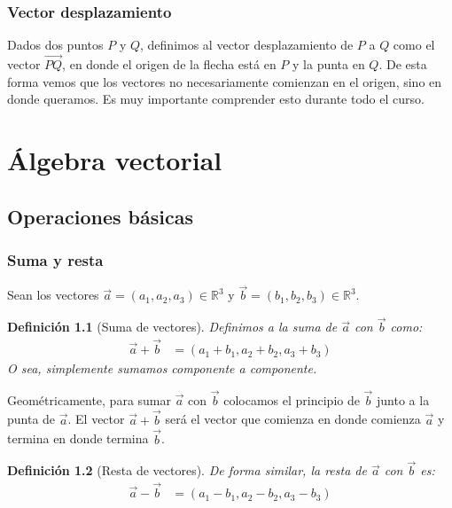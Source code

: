 \documentclass[12pt, fleqn]{report}                             %
\newtheorem{Definition}{Definición}[section]                    %
\newcommand{\ve}[1]{\vec{#1}}									%
\newcommand{\Ve}[1]{\overrightarrow{#1}}
\begin{document}
			\subsection{Vector desplazamiento}
			
			Dados dos puntos $P$ y $Q$, definimos al vector desplazamiento de $P$ a $Q$ como el vector $\Ve{PQ}$, en donde el origen de la flecha está en $P$ y la punta en $Q$. De esta forma vemos que los vectores no necesariamente comienzan en el origen, sino en donde queramos. Es muy importante comprender esto durante todo el curso.
			
	\chapter{Álgebra vectorial}
			
		\section{Operaciones básicas}
		
			\subsection{Suma y resta}
			
			Sean los vectores $\ve{a}=(a_1, a_2, a_3) \in \mathbb{R}^3$ y $\ve{b}=(b_1, b_2, b_3) \in \mathbb{R}^3$.
			
			\begin{Definition}[Suma de vectores]
				Definimos a la suma de $\ve{a}$ con $\ve{b}$ como:
				\begin{align}
					\ve{a}+\ve{b} &= (a_1 + b_1, a_2 + b_2, a_3 + b_3) \label{defSuma}
				\end{align}
				O sea, simplemente sumamos componente a componente.
			\end{Definition}
		
			Geométricamente, para sumar $\ve{a}$ con $\ve{b}$ colocamos el principio de $\ve{b}$ junto a la punta de $\ve{a}$. El vector $\ve{a}+\ve{b}$ será el vector que comienza en donde comienza $\ve{a}$ y termina en donde termina $\ve{b}$.
		
			\begin{Definition}[Resta de vectores]
				De forma similar, la resta de $\ve{a}$ con $\ve{b}$ es:
				\begin{align}
					\ve{a}-\ve{b} &= (a_1 - b_1, a_2 - b_2, a_3 - b_3) \label{defResta}
				\end{align}
			\end{Definition}
		
\end{document}
